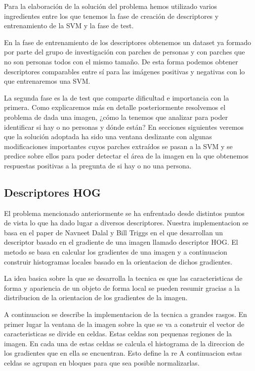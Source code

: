 \documentclass[a4paper,12pt]{article}
\begin{document}
Para la elaboración de la solución del problema hemos utilizado varios ingredientes entre los que tenemos la fase de creación de descriptores y entrenamiento de la SVM y la fase de test.

En la fase de entrenamiento de los descriptores obtenemos un dataset ya formado por parte del grupo de investigación con parches de personas y con parches que no son personas todos con el mismo tamaño. De esta forma podemos obtener descriptores comparables entre sí para las imágenes positivas y negativas con lo que entrenaremos una SVM.

La segunda fase es la de test que comparte dificultad e importancia con la primera. Como explicaremos más en detalle posteriormente resolvemos el problema de dada una imagen, ¿cómo la tenemos que analizar para poder identificar si hay o no personas y dónde están? En secciones siguientes veremos que la solución adoptada ha sido una ventana deslizante con algunas modificaciones importantes cuyos parches extraídos se pasan a la SVM y se predice sobre ellos para poder detectar el área de la imagen en la que obtenemos respuestas positivas a la pregunta de si hay o no una persona.

\subsection{Descriptores HOG}

El problema mencionado anteriormente se ha enfrentado desde
distintos puntos de vista lo que ha dado lugar a diversos
descriptores. Nuestra implementacion se basa en el paper de
Navneet Dalal y Bill Triggs en el que desarrollan un descriptor
basado en el gradiente de una imagen llamado descriptor HOG.
El metodo se basa en calcular los gradientes de una imagen y a
continuacion construir histogramas locales basado en la
orientacion de dichos gradientes.

La idea basica sobre la que se desarrolla la tecnica es que las
caracteristicas de forma y apariencia de un objeto de forma local
se pueden resumir gracias a la distribucion de la orientacion de
los gradientes de la imagen.

A continuacion se describe la implementacion de la tecnica a
grandes rasgos. En primer lugar la ventana de la imagen sobre la
que se va a construir el vector de caracteristicas se divide en
celdas. Estas celdas son pequenas regiones de la imagen. En cada
una de estas celdas se calcula el histograma de la direccion de
los gradientes que en ella se encuentran. Esto define la re
A continuacion estas
celdas se agrupan en bloques para que sea posible normalizarlas.
\end{document}
